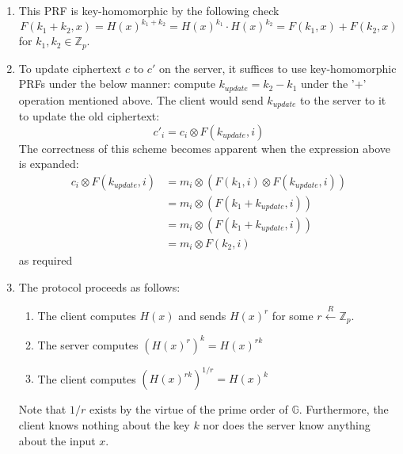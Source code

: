 \documentclass[12pt]{article}%
\begin{document}
\begin{enumerate}
  \item This PRF is key-homomorphic by the following check
  \[ F(k_1+k_2, x) = H(x)^{k_1 + k_2} = H(x)^{k_1} \cdot H(x)^{k_2} = F(k_1, x) + F(k_2, x)\]
  for $k_1,k_2 \in \mathbb{Z}_p$.
  \item To update ciphertext $c$ to $c'$ on the server, it suffices to use key-homomorphic PRFs under the below manner: compute $k_{update} = k_2 - k_1$ under the '+' operation mentioned above. The client would send $k_{update}$ to the server to it to update the old ciphertext:
  \[ c'_i = c_i \otimes F(k_{update}, i)\]
  The correctness of this scheme becomes apparent when the expression above is expanded:
  \begin{align*}
    c_i \otimes F(k_{update}, i) & = m_i \otimes (F(k_1, i) \otimes F(k_{update}, i)) \\
    & =  m_i \otimes (F(k_1 + k_{update}, i)) \\
    & = m_i \otimes (F(k_1 + k_{update}, i)) \\
    & =  m_i \otimes F(k_2, i)
  \end{align*}
  as required
  \item
  The protocol proceeds as follows:
  \begin{enumerate}
    \item The client computes $H(x)$ and sends $H(x)^r$ for some $r \xleftarrow{R} \mathbb{Z}_p$.
    \item The server computes $(H(x)^r)^k = H(x)^{rk}$
    \item The client computes $(H(x)^{rk})^{1/r} = H(x)^k$
  \end{enumerate}
  Note that $1/r$ exists by the virtue of the prime order of $\mathbb{G}$. Furthermore, the client knows nothing about the key $k$ nor does the server know anything about the input $x$.
\end{enumerate}
\end{document}
